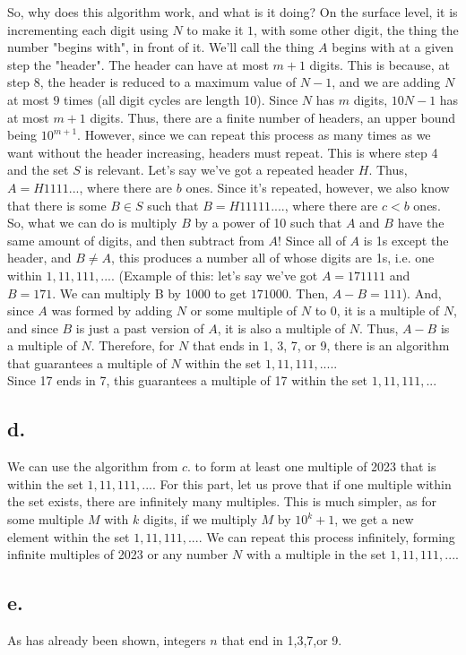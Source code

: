 \documentclass{article}
\begin{document}
So, why does this algorithm work, and what is it doing? On the surface level, it is incrementing each digit using $N$ to make it $1$, with some other digit, the thing the number "begins with", in front of it. We'll call the thing $A$ begins with at a given step the "header". The header can have at most $m+1$ digits. This is because, at step $8$, the header is reduced to a maximum value of $N-1$, and we are adding $N$ at most $9$ times (all digit cycles are length 10). Since $N$ has $m$ digits, $10N-1$ has at most $m+1$ digits. Thus, there are a finite number of headers, an upper bound being $10^{m+1}$. However, since we can repeat this process as many times as we want without the header increasing, headers must repeat. This is where step 4 and the set $S$ is relevant. Let's say we've got a repeated header $H$. Thus, $A=H1111...$, where there are $b$ ones. Since it's repeated, however, we also know that there is some $B \in S$ such that $B=H11111....$, where there are $c<b$ ones. So, what we can do is multiply $B$ by a power of 10 such that $A$ and $B$ have the same amount of digits, and then subtract from $A$! Since all of $A$ is 1s except the header, and $B\neq A$, this produces a number all of whose digits are 1s, i.e. one within ${1, 11, 111, ....}$ (Example of this: let's say we've got $A=171111$ and $B=171$. We can multiply B by 1000 to get $171000$. Then, $A-B=111$). And, since $A$ was formed by adding $N$ or some multiple of $N$ to 0, it is a multiple of $N$, and since $B$ is just a past version of $A$, it is also a multiple of $N$. Thus, $A-B$ is a multiple of $N$. Therefore, for $N$ that ends in 1, 3, 7, or 9, there is an algorithm that guarantees a multiple of $N$ within the set ${1, 11, 111, ....}$.
\\Since 17 ends in 7, this guarantees a multiple of 17 within the set ${1, 11, 111, ...}$
\subsection*{d. }
We can use the algorithm from $c.$ to form at least one multiple of 2023 that is within the set ${1, 11, 111, ...}$. For this part, let us prove that if one multiple within the set exists, there are infinitely many multiples. This is much simpler, as for some multiple $M$ with $k$ digits, if we multiply $M$ by $10^k+1$, we get a new element within the set ${1, 11, 111, ...}$. We can repeat this process infinitely, forming infinite multiples of 2023 or any number $N$ with a multiple in the set ${1, 11, 111, ...}$.
\subsection*{e.}
As has already been shown, integers $n$ that end in 1,3,7,or 9.
\end{document}
